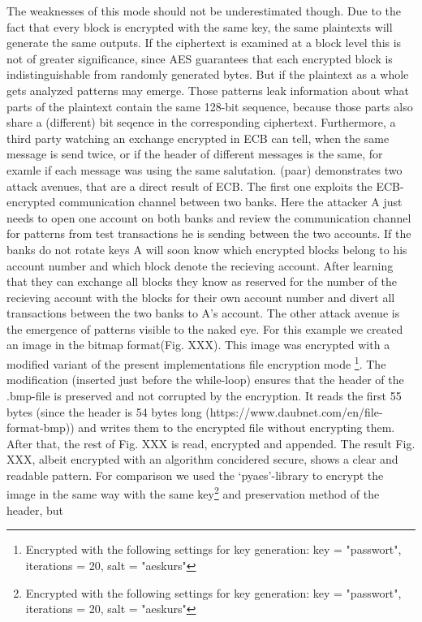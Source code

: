 The weaknesses of this mode
should not be underestimated though. Due to the fact that every block is
encrypted with the same key, the same plaintexts will generate the same
outputs. If the ciphertext is examined at a block level this is not of
greater significance, since AES guarantees that each encrypted block is
indistinguishable from randomly generated bytes. But if the plaintext as
a whole gets analyzed patterns may emerge. Those patterns leak
information about what parts of the plaintext contain the same 128-bit
sequence, because those parts also share a (different) bit seqence in
the corresponding ciphertext. Furthermore, a third party watching an
exchange encrypted in ECB can tell, when the same
message is send twice, or if the header of different messages is the
same, for examle if each message was using the same salutation. (paar)
demonstrates two attack avenues, that are a direct result of ECB. The
first one exploits the ECB-encrypted communication channel between two
banks. Here the attacker A just needs to open one account on both banks
and review the communication channel for patterns from test transactions
he is sending between the two accounts. If the banks do not rotate keys
A will soon know which encrypted blocks belong to his account number and
which block denote the recieving account. After learning that they can
exchange all blocks they know as reserved for the number of the
recieving account with the blocks for their own account number and
divert all transactions between the two banks to A's account. The other
attack avenue is the emergence of patterns visible to the naked eye. For
this example we created an image in the bitmap format(Fig. XXX). This
image was encrypted with a modified variant of the present
implementations file encryption mode \footnote{Encrypted with the following settings for key generation: key = "passwort", iterations = 20, salt = "aeskurs"}. The modification (inserted just
before the while-loop) ensures that the header of the .bmp-file is
preserved and not corrupted by the encryption. It reads the first 55
bytes (since the header is 54 bytes long
(https://www.daubnet.com/en/file-format-bmp)) and writes them to the
encrypted file without encrypting them. After that, the rest of Fig. XXX
is read, encrypted and appended. The result Fig. XXX, albeit encrypted
with an algorithm concidered secure, shows a clear and readable pattern.
For comparison we used the `pyaes'-library to encrypt the image in the
same way with the same key\footnote{Encrypted with the following settings for key generation: key = "passwort", iterations = 20, salt = "aeskurs"} and preservation method of the header, but
